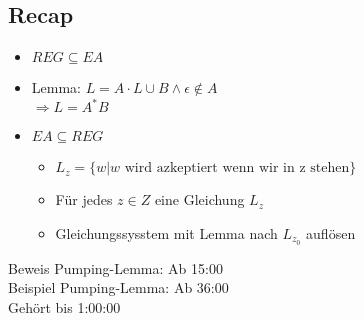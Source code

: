 \documentclass{article}
\begin{document}
\subsection*{Recap}
\begin{itemize}
    \item $REG \subseteq EA$
    \item Lemma: $L = A \cdot L \cup B \land \epsilon \notin A$ \\
        $\Rightarrow L = A^* B$
    \item $EA \subseteq REG$ 
    \begin{itemize}
        \item $L_z = \{ w | w \text{ wird azkeptiert wenn wir in z stehen}\}$
        \item Für jedes $z \in Z$ eine Gleichung $L_z$
        \item Gleichungssysstem mit Lemma nach $L_{z_0}$ auflösen
    \end{itemize}
\end{itemize}
Beweis Pumping-Lemma: Ab 15:00 \\
Beispiel Pumping-Lemma: Ab 36:00 \\
Gehört bis 1:00:00
\end{document}
